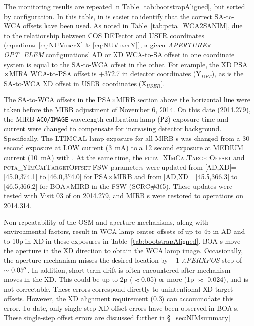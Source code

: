 

The  monitoring results are repeated in Table~\ref{tab:bootstrapAligned}, but sorted by configuration.
In this table, in is easier to identify that the correct SA-to-WCA offsets have been used. As noted in Table~\ref{tab:pcta_WCA2SANIM},
due to the relationship between COS DETector and USER coordinates (equations~\ref{eq:NUVuserX} \& \ref{eq:NUVuserY}),
a given \textit{APERTURE}$\times$\textit{OPT\_ELEM} configurations' AD or XD WCA-to-SA offset in one coordinate system is equal to the SA-to-WCA offset in the other.
For example, the XD PSA$\times$MIRA WCA-to-PSA offset is +372.7 in detector coordinates (Y$_{DET}$), as is the SA-to-WCA XD offset in USER coordinates (X$_{USER}$).

The SA-to-WCA offsets in the PSA$\times$MIRB section above the horizontal line were taken before
the MIRB  adjustment of November 6, 2014. On this date (2014.279), the MIRB \texttt{ACQ/IMAGE} wavelength calibration lamp (P2) exposure time and current were changed
to compensate for increasing detector background. Specifically,
The \textsc{LTIMCAL} lamp exposure for all MIRB s was changed
from a 30 second exposure at LOW current (3~mA) to a 12 second exposure at MEDIUM current (10~mA) with .
At the same time, the \textsc{pcta\_XImCalTargetOffset} and \textsc{pcta\_YImCalTargetOffset} FSW parameters were updated from [AD,XD]=[45.0,374.1] to [46.0,374.0] for PSA$\times$MIRB
and from [AD,XD]=[45.5,366.3] to [46.5,366.2] for BOA$\times$MIRB in the FSW (\textsc{SCRC\#365}).
These updates were tested with Visit 03 of  on 2014.279, and MIRB s were restored to operations on 2014.314.

Non-repeatability of the OSM and aperture mechanisms, along with environmental factors, result in WCA lamp center offsets of up to 4p in AD and to 10p in XD in these exposures in Table~\ref{tab:bootstrapAligned}.
BOA s move the aperture in the XD direction to obtain the WCA lamp image. Occasionally, the aperture mechanism misses the desired location by $\pm 1 $ \textit{APERXPOS} step of $\sim0.05\hbox{$^{\prime\prime}$}$.
In addition, short term drift is often encountered after mechanism moves in the XD. This could be up to 2p ($\approx$0.05\arcsec) or more (1p $\approx$ 0.024\arcsec), and is not correctable. These errors correspond directly to unintentional XD target offsets. However, the XD alignment requirement (0.3\arcsec) can accommodate this error.
To date, only single-step XD offset errors have been observed in BOA s.
These single-step offset errors are discussed further in \S~\ref{sec:NIMsummary}

